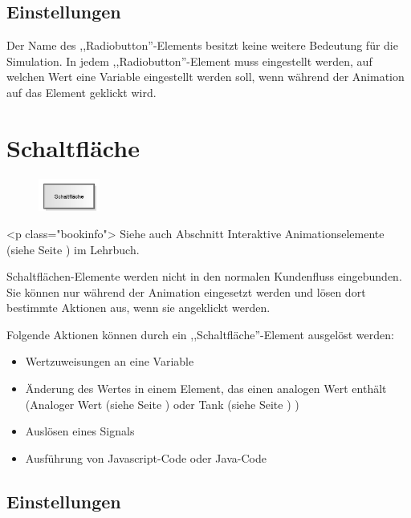 \subsection*{Einstellungen}

Der Name des ,,Radiobutton''-Elements besitzt keine weitere Bedeutung für die Simulation.
In jedem ,,Radiobutton''-Element muss eingestellt werden, auf welchen Wert eine Variable
eingestellt werden soll, wenn während der Animation auf das Element geklickt wird.


\section{Schaltfläche}
\label{ref:ModelElementInteractiveButton}

\begin{figure}
\vspace{-22pt}
\includegraphics[width=2cm]{imageModelElementInteractiveButton.png}
\vspace{-22pt}
\end{figure}

<p class="bookinfo">
Siehe auch Abschnitt Interaktive Animationselemente (siehe Seite \pageref{ref:book:8.12.4}) im Lehrbuch.

Schaltflächen-Elemente werden nicht in den normalen Kundenfluss eingebunden.
Sie können nur während der Animation eingesetzt werden und lösen dort bestimmte
Aktionen aus, wenn sie angeklickt werden.

Folgende Aktionen können durch ein ,,Schaltfläche''-Element ausgelöst werden:

\begin{itemize}
  \item Wertzuweisungen an eine Variable 
  \item Änderung des Wertes in einem Element, das einen analogen Wert enthält
  (Analoger Wert (siehe Seite \pageref{ref:ModelElementAnalogValue}) oder Tank (siehe Seite \pageref{ref:ModelElementTank}) )
  \item Auslösen eines Signals 
  \item Ausführung von Javascript-Code oder Java-Code 
\end{itemize}

\subsection*{Einstellungen}


